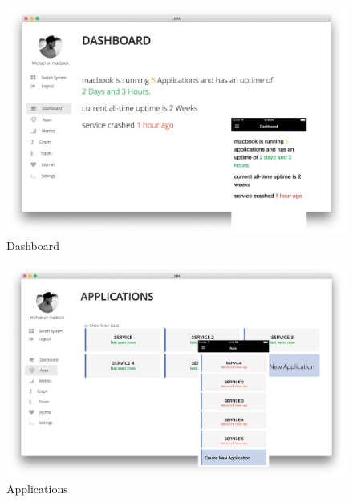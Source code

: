 \begin{figure}[h!p]
 \centering
 \includegraphics[width=0.9\linewidth]{appendix/app/dashboard.png}
 \caption{Dashboard}
\end{figure}

\begin{figure}[h!p]
 \centering
 \includegraphics[width=0.9\linewidth]{appendix/app/apps.png}
 \caption{Applications}
\end{figure}

